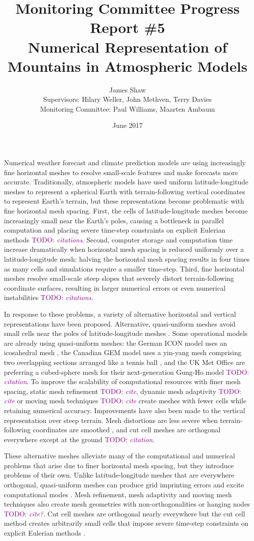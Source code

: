 \documentclass[a4paper,11pt]{article}
\title{
\vspace*{-2em}
Monitoring Committee Progress Report \#5\\
\vspace*{1em}
\Large{Numerical Representation of Mountains in Atmospheric Models}}
\author{James Shaw
\vspace{0.5em} \\
\large{Supervisors: Hilary Weller, John Methven, Terry Davies}
\vspace{0.5em} \\
\large{Monitoring Committee: Paul Williams, Maarten Ambaum}}
\date{June 2017}
\newcommand{\TODO}[1]{\textcolor{purple}{TODO: \emph{#1}}}
\begin{document}
\maketitle

Numerical weather forecast and climate prediction models are using increasingly fine horizontal meshes to resolve small-scale features and make forecasts more accurate.  Traditionally, atmospheric models have used uniform latitude-longitude meshes to represent a spherical Earth with terrain-following vertical coordinates to represent Earth's terrain, but these representations become problematic with fine horizontal mesh spacing.
First, the cells of latitude-longitude meshes become increasingly small near the Earth's poles, causing a bottleneck in parallel computation and placing severe time-step constraints on explicit Eulerian methods \TODO{citations}.
Second, computer storage and computation time increase dramatically when horizontal mesh spacing is reduced uniformly over a latitude-longitude mesh: halving the horizontal mesh spacing results in four times as many cells and simulations require a smaller time-step.
Third, fine horizontal meshes resolve small-scale steep slopes that severely distort terrain-following coordinate surfaces, resulting in larger numerical errors or even numerical instabilities \TODO{citations}.

In response to these problems, a variety of alternative horizontal and vertical representations have been proposed.  Alternative, quasi-uniform meshes avoid small cells near the poles of latitude-longitude meshes \citep{staniforth-thuburn2012}.  Some operational models are already using quasi-uniform meshes: the German ICON model uses an icosahedral mesh \citep{wan2013}, the Canadian GEM model uses a yin-yang mesh comprising two overlapping sections arranged like a tennis ball \citep{qaddouri2011}, and the UK Met Office are preferring a cubed-sphere mesh for their next-generation Gung-Ho model \TODO{citation}.
To improve the scalability of computational resources with finer mesh spacing, static mesh refinement \TODO{cite}, dynamic mesh adaptivity \TODO{cite} or moving mesh techniques \TODO{cite} create meshes with fewer cells while retaining numerical accuracy.
Improvements have also been made to the vertical representation over steep terrain.  Mesh distortions are less severe when terrain-following coordinates are smoothed \citep{leuenberger2010,klemp2011}, and cut cell meshes are orthogonal everywhere except at the ground \TODO{citation}.

These alternative meshes alleviate many of the computational and numerical problems that arise due to finer horizontal mesh spacing, but they introduce problems of their own.
Unlike latitude-longitude meshes that are everywhere orthogonal, quasi-uniform meshes can produce grid imprinting errors and excite computational modes \citep{weller2012}.
Mesh refinement, mesh adaptivity and moving mesh techniques also create mesh geometries with non-orthogonalities or hanging nodes \TODO{cite?}.
Cut cell meshes are orthogonal nearly everywhere but the cut cell method creates arbitrarily small cells that impose severe time-step constraints on explicit Eulerian methods \citep{klein2009}.
\end{document}
